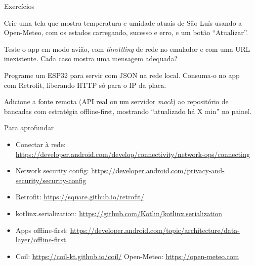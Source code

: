 \documentclass[aspectratio=169,10pt]{beamer}
\begin{document}
\begin{frame}{Exercícios}
  \begin{exercicio}
    Crie uma tela que mostra temperatura e umidade atuais de São Luís usando a Open-Meteo, com os estados carregando, sucesso e erro, e um botão ``Atualizar''.
  \end{exercicio}
  \begin{exercicio}
    Teste o app em modo avião, com \emph{throttling} de rede no emulador e com uma URL inexistente. Cada caso mostra uma mensagem adequada?
  \end{exercicio}
  \begin{exercicio}
    Programe um ESP32 para servir  com JSON na rede local. Consuma-o no app com Retrofit, liberando HTTP só para o IP da placa.
  \end{exercicio}
  \begin{projeto}
    Adicione a fonte remota (API real ou um servidor \emph{mock}) ao repositório de bancadas com estratégia offline-first, mostrando ``atualizado há X min'' no painel.
  \end{projeto}
\end{frame}

\begin{frame}{Para aprofundar}
  \small
  \begin{itemize}
    \item Conectar à rede: \url{https://developer.android.com/develop/connectivity/network-ops/connecting}
    \item Network security config: \url{https://developer.android.com/privacy-and-security/security-config}
    \item Retrofit: \url{https://square.github.io/retrofit/}
    \item kotlinx.serialization: \url{https://github.com/Kotlin/kotlinx.serialization}
    \item Apps offline-first: \url{https://developer.android.com/topic/architecture/data-layer/offline-first}
    \item Coil: \url{https://coil-kt.github.io/coil/} \quad Open-Meteo: \url{https://open-meteo.com}
  \end{itemize}
\end{frame}
\end{document}

